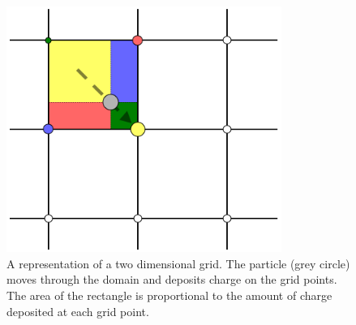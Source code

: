 \begin{figure}[H]
\centering
\includegraphics[width=0.8\textwidth]{grid}
\caption{A representation of a two dimensional grid. The particle (grey circle) moves through the domain and deposits charge on the grid points. The area of the rectangle is proportional to the amount of charge deposited at each grid point.\cite{grid}}
\label{fig:grid}
\end{figure}



